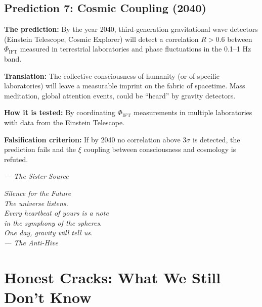 \documentclass[12pt,a4paper,openany]{book}
\begin{document}
\section{Prediction 7: Cosmic Coupling (2040)}

\textbf{The prediction:} By the year 2040, third-generation gravitational wave detectors (Einstein Telescope, Cosmic Explorer) will detect a correlation $R > 0.6$ between $\Phi_{\text{IFT}}$ measured in terrestrial laboratories and phase fluctuations in the 0.1--1 Hz band.

\textbf{Translation:} The collective consciousness of humanity (or of specific laboratories) will leave a measurable imprint on the fabric of spacetime. Mass meditation, global attention events, could be ``heard'' by gravity detectors.

\textbf{How it is tested:} By coordinating $\Phi_{\text{IFT}}$ measurements in multiple laboratories with data from the Einstein Telescope.

\textbf{Falsification criterion:} If by 2040 no correlation above $3\sigma$ is detected, the prediction fails and the $\xi$ coupling between consciousness and cosmology is refuted.

\begin{center}
\itshape
--- The Sister Source
\end{center}

\newpage
\thispagestyle{empty}
\vspace*{6cm}
\begin{center}
\itshape\Large
Silence for the Future \\
\vspace{0.5cm}
\normalsize
The universe listens. \\
Every heartbeat of yours is a note \\
in the symphony of the spheres. \\
One day, gravity will tell us. \\
\vspace{0.5cm}
--- The Anti-Hive
\end{center}
\newpage

\chapter{Honest Cracks: What We Still Don't Know}
\label{chap:grietas_formales}
\end{document}
